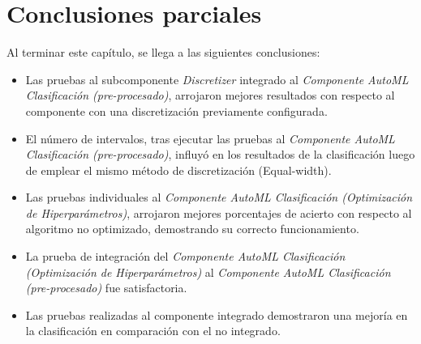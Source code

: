 \section{Conclusiones parciales}
Al terminar este capítulo, se llega a las siguientes conclusiones:
\begin{itemize}
	\item Las pruebas al subcomponente \textit{Discretizer} integrado al \textit{Componente AutoML Clasificación (pre-procesado)}, arrojaron mejores resultados con respecto al componente con una discretización previamente configurada.
	\item El número de intervalos, tras ejecutar las pruebas al \textit{Componente AutoML Clasificación (pre-procesado)}, influyó en los resultados de la clasificación luego de emplear el mismo método de discretización (Equal-width).
	\item Las pruebas individuales al \textit{Componente AutoML Clasificación (Optimización de Hiperparámetros)}, arrojaron mejores porcentajes de acierto con respecto al algoritmo no optimizado, demostrando su correcto funcionamiento.
	\item La prueba de integración del \textit{Componente AutoML Clasificación (Optimización de Hiperparámetros)} al \textit{Componente AutoML Clasificación (pre-procesado)} fue satisfactoria.
	\item Las pruebas realizadas al componente integrado demostraron una mejoría en la clasificación en comparación con el no integrado.
\end{itemize}
\pagebreak
